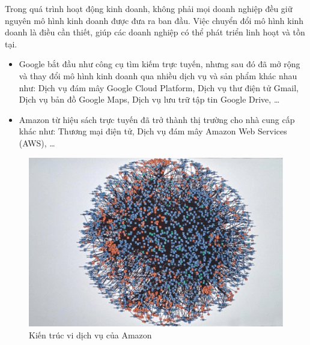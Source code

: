 Trong quá trình hoạt động kinh doanh, không phải mọi doanh nghiệp đều giữ nguyên mô hình kinh doanh được đưa ra ban đầu. Việc chuyển đổi mô hình kinh doanh là điều cần thiết, giúp các doanh nghiệp có thể phát triển linh hoạt và tồn tại.

\begin{example}

\begin{itemize}

\item Google bắt đầu như công cụ tìm kiếm trực tuyến, nhưng sau đó đã mở rộng và thay đổi mô hình kinh doanh qua nhiều dịch vụ và sản phẩm khác nhau như: Dịch vụ đám mây Google Cloud Platform, Dịch vụ thư điện tử Gmail, Dịch vụ bản đồ Google Maps, Dịch vụ lưu trữ tập tin Google Drive, \dots

\item Amazon từ hiệu sách trực tuyến đã trở thành thị trường cho nhà cung cấp khác như: Thương mại điện tử, Dịch vụ đám mây Amazon Web Services (AWS), \dots

\end{itemize}

\end{example}

\begin{figure}[H]

\centering

\includegraphics[scale = 0.5]{pictures/_kien_truc_vi_dich_vu_cua_amazon/main.png}

\caption{Kiến trúc vi dịch vụ của Amazon}

\end{figure}


